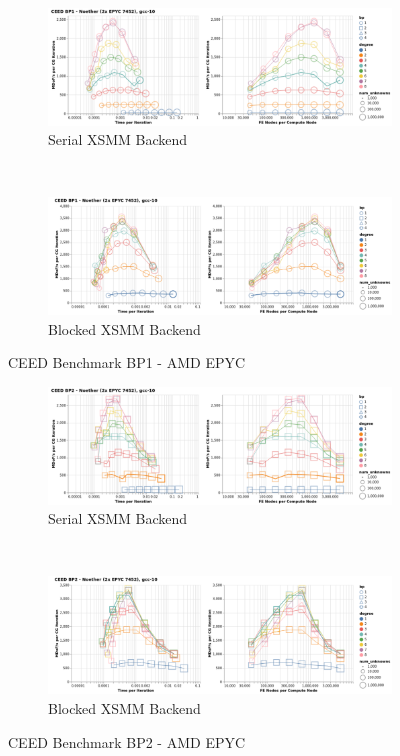 \begin{figure}[ht!]
\begin{subfigure}{.99\textwidth}
\includegraphics[width=.99\linewidth]{../img/xsmmSerialBP1Clip}
\caption{Serial XSMM Backend}
\end{subfigure}\\
\begin{subfigure}{.99\textwidth}
\includegraphics[width=.99\linewidth]{../img/xsmmBlockedBP1Clip}
\caption{Blocked XSMM Backend}
\end{subfigure}
\caption{CEED Benchmark BP1 - AMD EPYC}
\label{fig:cpu-bp1}
\end{figure}

\begin{figure}[ht!]
\begin{subfigure}{.99\textwidth}
\includegraphics[width=.99\linewidth]{../img/xsmmSerialBP2Clip}
\caption{Serial XSMM Backend}
\end{subfigure}\\
\begin{subfigure}{.99\textwidth}
\includegraphics[width=.99\linewidth]{../img/xsmmBlockedBP2Clip}
\caption{Blocked XSMM Backend}
\end{subfigure}
\caption{CEED Benchmark BP2 - AMD EPYC}
\label{fig:cpu-bp2}
\end{figure}

